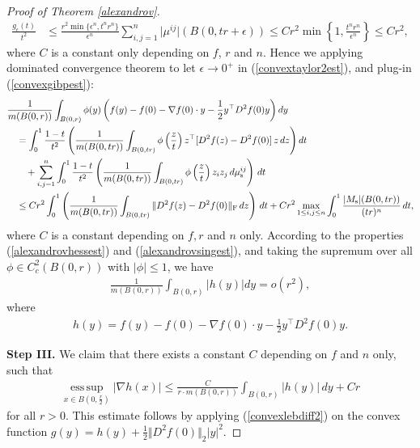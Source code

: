 \documentclass{article}
\numberwithin{equation}{section}
\DeclareMathOperator{\esssup}{ess\,sup}
\theoremstyle{plain}
\theoremstyle{definition}
\begin{document}
\begin{proof}[Proof of Theorem \ref{alexandrov}]
\begin{align*}
	\frac{g_\epsilon(t)}{t^2}&\leq\frac{r^2\min\{\epsilon^n,t^nr^n\}}{\epsilon^n}\sum_{i,j=1}^n\vert\mu^{ij}\vert(B(0,tr+\epsilon))\leq Cr^2\min\left\{1,\frac{t^nr^n}{\epsilon^n}\right\}\leq Cr^2,
\end{align*}
where $C$ is a constant only depending on $f$, $r$ and $n$. Hence we applying dominated convergence theorem to let $\epsilon\to 0^+$ in (\ref{convextaylor2est}), and plug-in (\ref{convexgibpest}):
\begin{align*}
	&\frac{1}{m(B(0,r))}\int_{B(0,r)}\phi(y)\left(f(y)-f(0)-\nabla f(0)\cdot y-\frac{1}{2}y^\top D^2f(0)y\right)dy\notag\\
	&\quad=\int_0^1\frac{1-t}{t^2}\left(\frac{1}{m(B(0,tr))}\int_{B(0,tr)}\phi\left(\frac{z}{t}\right)z^\top[D^2f(z)-D^2f(0)]\,z\,dz\right)dt\\
	&\quad\quad+\sum_{i,j=1}^n\int_0^1\frac{1-t}{t^2}\left(\frac{1}{m(B(0,tr))}\int_{B(0,tr)}\phi\left(\frac{z}{t}\right)z_iz_j\,d\mu^{ij}_{\rm s}\right)\,dt\\
	&\quad\leq Cr^2\int_0^1\left(\frac{1}{m(B(0,tr))}\int_{B(0,tr)}\Vert D^2f(z)-D^2f(0)\Vert_\mathrm{F}\,dz\right)\,dt+Cr^2\max_{1\leq i,j\leq n}\int_0^1\frac{\vert M_\mathrm{s}\vert(B(0,tr))}{(tr)^n}\,dt,
\end{align*}
where $C$ is a constant depending on $f,r$ and $n$ only. According to the properties (\ref{alexandrovhessest}) and (\ref{alexandrovsingest}), and taking the supremum over all $\phi\in C_c^2(B(0,r))$ with $\vert\phi\vert\leq 1$, we have
\begin{align}
	\frac{1}{m(B(0,r))}\int_{B(0,r)}\vert h(y)\vert dy=o(r^2),\label{hlebdifforsq}
\end{align}
where
\begin{align}
	h(y)=f(y)-f(0)-\nabla f(0)\cdot y-\frac{1}{2}y^\top D^2f(0)y.\label{convextaylor2remainder}
\end{align}
\item\textbf{Step III.} We claim that there exists a constant $C$ depending on $f$ and $n$ only, such that
\begin{align}
	\underset{x\in B(0,\frac{r}{2})}{\esssup}\vert\nabla h(x)\vert\leq\frac{C}{r\cdot m(B(0,r))}\int_{B(0,r)}\vert h(y)\vert\,dy+Cr\label{alexandrovgradest2}
\end{align}
for all $r>0$. This estimate follows by applying (\ref{convexlebdiff2}) on the convex function $g(y)=h(y)+\frac{1}{2}\Vert D^2f(0)\Vert_2\vert y\vert^2$.


\end{proof}
\end{document}
